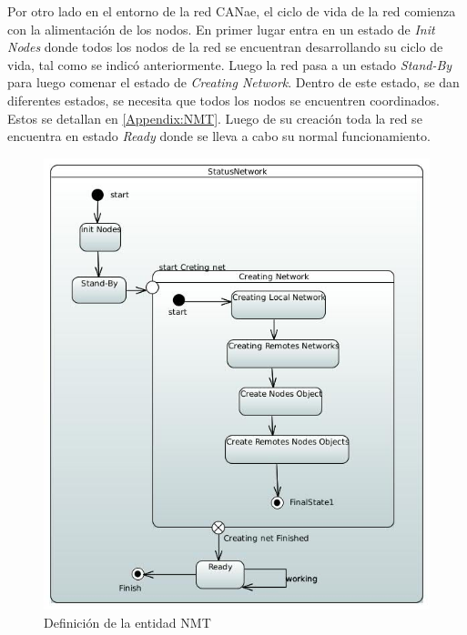 Por otro lado en el entorno de la red CANae, el ciclo de vida de la red comienza
con la alimentación de los nodos. En primer lugar entra en un estado de
\textit{Init Nodes} donde todos los nodos de la red se encuentran desarrollando
su ciclo de vida, tal como se indicó anteriormente. Luego la red pasa a un
estado \textit{Stand-By} para luego comenar el estado de \textit{Creating
  Network}. Dentro de este estado, se dan diferentes estados, se necesita que
todos los nodos se encuentren coordinados. Estos se detallan en
\ref{Appendix:NMT}. Luego de su creación toda la red se encuentra en estado
\textit{Ready} donde se lleva a cabo su normal funcionamiento.

\begin{figure}[h!]
 \centering
 \includegraphics[scale=0.4]{images/Secciones/AppendixA/StatusNetwork.JPG}
  \caption{Definición de la entidad NMT}
\label{fig:NodeStatus}
\end{figure}

